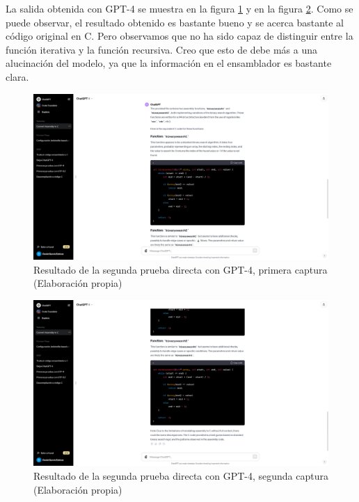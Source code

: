 La salida obtenida con GPT-4 se muestra en la figura \ref{fig:resultado_gpt4_directo_V2_1} y
en la figura \ref{fig:resultado_gpt4_directo_V2_2}. Como se puede observar, el resultado obtenido
es bastante bueno y se acerca bastante al código original en C. Pero observamos que no ha sido capaz
de distinguir entre la función iterativa y la función recursiva. Creo que esto de debe más a una
alucinación del modelo, ya que la información en el ensamblador es bastante clara.

\begin{figure}[H]
    \begin{center}
      \includegraphics[scale=0.3]{figuras/Capitulo_05/ResultadoDirectoGPT4_V2_1.png}
    \end{center}
    \caption[Resultado de la segunda prueba directa con GPT-4, primera captura]{Resultado de la segunda prueba directa con GPT-4, primera captura (Elaboración propia)}
    \label{fig:resultado_gpt4_directo_V2_1}
\end{figure}

\begin{figure}[H]
    \begin{center}
      \includegraphics[scale=0.3]{figuras/Capitulo_05/ResultadoDirectoGPT4_V2_2.png}
    \end{center}
    \caption[Resultado de la segunda prueba directa con GPT-4, segunda captura]{Resultado de la segunda prueba directa con GPT-4, segunda captura (Elaboración propia)}
    \label{fig:resultado_gpt4_directo_V2_2}
\end{figure}

